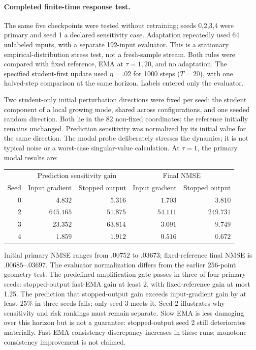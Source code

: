 \documentclass[11pt,a4paper]{article}
\begin{document}
\paragraph{Completed finite-time response test.}
The same five checkpoints were tested without retraining; seeds 0,2,3,4
were primary and seed 1 a declared sensitivity case. Adaptation repeatedly
used 64 unlabeled inputs, with a separate 192-input evaluator. This is a
stationary empirical-distribution stress test, not a fresh-sample stream.
Both rules were compared with fixed reference, EMA at $\tau=1,20$, and
no adaptation. The specified student-first update used $\eta=.02$ for
1000 steps ($T=20$), with one halved-step comparison at the same horizon.
Labels entered only the evaluator.

Two student-only initial perturbation directions were fixed per seed:
the student component of a local growing mode, shared across configurations,
and one seeded random direction. Both lie in the 82 non-fixed coordinates;
the reference initially remains unchanged. Prediction sensitivity was
normalized by its initial value for the same direction. The modal probe
deliberately stresses the dynamics; it is not typical noise or a worst-case
singular-value calculation. At $\tau=1$, the primary modal results are:
\begin{center}
\begin{tabular}{rrrrr}
 & \multicolumn{2}{c}{Prediction sensitivity gain}
 & \multicolumn{2}{c}{Final NMSE}\\
Seed & Input gradient & Stopped output & Input gradient & Stopped output\\ \hline
0 & $4.832$ & $5.316$ & $1.703$ & $3.810$\\
2 & $645.165$ & $51.875$ & $54.111$ & $249.731$\\
3 & $23.352$ & $63.814$ & $3.091$ & $9.749$\\
4 & $1.859$ & $1.912$ & $0.516$ & $0.672$
\end{tabular}
\end{center}
Initial primary NMSE ranges from $.00752$ to $.03673$; fixed-reference
final NMSE is $.00685$--$.03697$. The evaluator normalization differs
from the earlier 256-point geometry test. The predefined amplification
gate passes in three of four primary seeds: stopped-output fast-EMA gain
at least 2, with fixed-reference gain at most 1.25. The prediction that
stopped-output gain exceeds input-gradient gain by at least 25\% in three
seeds fails; only seed 3 meets it. Seed 2 illustrates why sensitivity and
risk rankings must remain separate. Slow EMA is less damaging over this
horizon but is not a guarantee: stopped-output seed 2 still deteriorates
materially. Fast-EMA consistency discrepancy increases in these runs;
monotone consistency improvement is not claimed.
\end{document}
